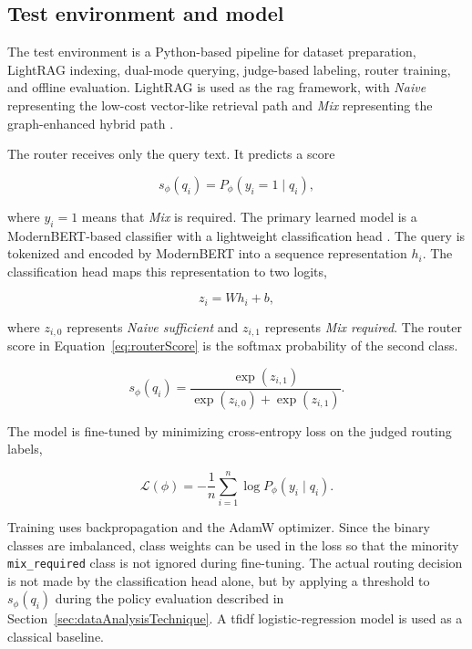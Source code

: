 \documentclass[english, bibtex]{kththesis}               %
\numberwithin{listing}{chapter}
\begin{document}
\subsection{Test environment and model}

The test environment is a Python-based pipeline for dataset preparation, LightRAG indexing, dual-mode querying, judge-based labeling, router training, and offline evaluation. LightRAG is used as the \gls{rag} framework, with \emph{Naive} representing the low-cost vector-like retrieval path and \emph{Mix} representing the graph-enhanced hybrid path \cite{lightrag2024}.

The router receives only the query text. It predicts a score

\begin{equation}
\label{eq:routerScore}
s_\phi(q_i)=P_\phi(y_i=1 \mid q_i),
\end{equation}

where \(y_i=1\) means that \emph{Mix} is required. The primary learned model is a ModernBERT-based classifier with a lightweight classification head \cite{warner2024modernbert}. The query is tokenized and encoded by ModernBERT into a sequence representation \(h_i\). The classification head maps this representation to two logits,

\begin{equation}
\label{eq:modernBertLogits}
z_i = W h_i + b,
\end{equation}

where \(z_{i,0}\) represents \emph{Naive sufficient} and \(z_{i,1}\) represents \emph{Mix required}. The router score in Equation~\ref{eq:routerScore} is the softmax probability of the second class.

\begin{equation}
\label{eq:modernBertSoftmax}
s_\phi(q_i)=
\frac{\exp(z_{i,1})}
{\exp(z_{i,0})+\exp(z_{i,1})}.
\end{equation}

The model is fine-tuned by minimizing cross-entropy loss on the judged routing labels,

\begin{equation}
\label{eq:modernBertLoss}
\mathcal{L}(\phi)=
-\frac{1}{n}\sum_{i=1}^{n}
\log P_\phi(y_i \mid q_i).
\end{equation}

Training uses backpropagation and the AdamW optimizer. Since the binary classes are imbalanced, class weights can be used in the loss so that the minority \texttt{mix\_required} class is not ignored during fine-tuning. The actual routing decision is not made by the classification head alone, but by applying a threshold to \(s_\phi(q_i)\) during the policy evaluation described in Section~\ref{sec:dataAnalysisTechnique}. A \gls{tfidf} logistic-regression model is used as a classical baseline.
\end{document}
